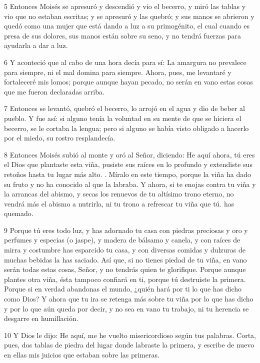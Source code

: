 \par 5 Entonces Moisés se apresuró y descendió y vio el becerro, y miró las tablas y vio que no estaban escritas; y se apresuró y las quebró; y sus manos se abrieron y quedó como una mujer que está dando a luz a su primogénito, el cual cuando es presa de sus dolores, sus manos están sobre su seno, y no tendrá fuerzas para ayudarla a dar a luz.

\par 6 Y aconteció que al cabo de una hora decía para sí: La amargura no prevalece para siempre, ni el mal domina para siempre. Ahora, pues, me levantaré y fortaleceré mis lomos; porque aunque hayan pecado, no serán en vano estas cosas que me fueron declaradas arriba.

\par 7 Entonces se levantó, quebró el becerro, lo arrojó en el agua y dio de beber al pueblo. Y fue así: si alguno tenía la voluntad en su mente de que se hiciera el becerro, se le cortaba la lengua; pero si alguno se había visto obligado a hacerlo por el miedo, su rostro resplandecía.

\par 8 Entonces Moisés subió al monte y oró al Señor, diciendo: He aquí ahora, tú eres el Dios que plantaste esta viña, pusiste sus raíces en lo profundo y extendiste sus retoños hasta tu lugar más alto. . Míralo en este tiempo, porque la viña ha dado su fruto y no ha conocido al que la labraba. Y ahora, si te enojas contra tu viña y la arrancas del abismo, y secas los renuevos de tu altísimo trono eterno, no vendrá más el abismo a nutrirla, ni tu trono a refrescar tu viña que tú. has quemado.

\par 9 Porque tú eres todo luz, y has adornado tu casa con piedras preciosas y oro y perfumes y especias (o jaspe), y madera de bálsamo y canela, y con raíces de mirra y costumbre has esparcido tu casa, y con diversas comidas y dulzuras de muchas bebidas la has saciado. Así que, si no tienes piedad de tu viña, en vano serán todas estas cosas, Señor, y no tendrás quien te glorifique. Porque aunque plantes otra viña, ésta tampoco confiará en ti, porque tú destruiste la primera. Porque si en verdad abandonas el mundo, ¿quién hará por ti lo que has dicho como Dios? Y ahora que tu ira se retenga más sobre tu viña por lo que has dicho y por lo que aún queda por decir, y no sea en vano tu trabajo, ni tu herencia se desgarre en humillación.

\par 10 Y Dios le dijo: He aquí, me he vuelto misericordioso según tus palabras. Corta, pues, dos tablas de piedra del lugar donde labraste la primera, y escribe de nuevo en ellas mis juicios que estaban sobre las primeras.

